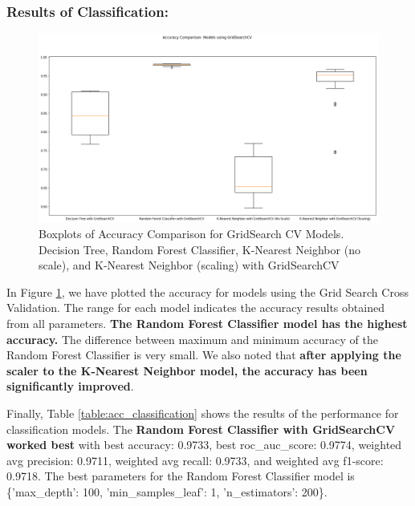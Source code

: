 \documentclass[11pt]{article}
\begin{document}
\subsubsection{Results of Classification:}

\begin{figure}[h!]
\centering 
\includegraphics[scale=0.35]{clf_results.png}
\caption{Boxplots of Accuracy Comparison for GridSearch CV Models.\\
Decision Tree, Random Forest Classifier, K-Nearest Neighbor (no scale), and K-Nearest Neighbor (scaling) with GridSearchCV}
  \label{fig:clf_results_gridcv}
\end{figure}

In Figure \ref{fig:clf_results_gridcv}, we have plotted the accuracy for models using the Grid Search Cross Validation. The range for each model indicates the accuracy results obtained from all parameters. 
%
\textbf{The Random Forest Classifier model has the highest accuracy.} The difference between maximum and minimum accuracy of the Random Forest Classifier is very small. 
% 
We also noted that \textbf{after applying the scaler to the K-Nearest Neighbor model, the accuracy has been significantly improved}.

Finally, 
Table \ref{table:acc_classification} shows the results of the performance for classification models. 
%
The \textbf{Random Forest Classifier with GridSearchCV worked best} with 
best accuracy: 0.9733,
best roc\_auc\_score: 0.9774,
weighted avg precision: 0.9711,
weighted avg recall: 0.9733, and
weighted avg f1-score: 0.9718.
%
The best parameters for the Random Forest Classifier model is 
\{'max\_depth': 100, 'min\_samples\_leaf': 1, 'n\_estimators': 200\}.
\end{document}
